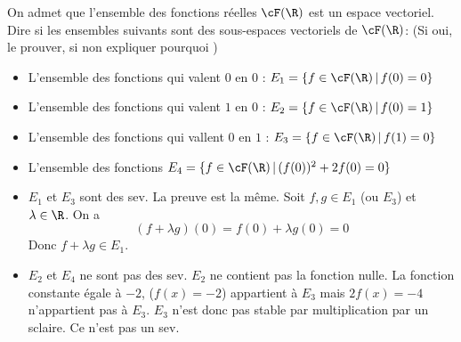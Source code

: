 



\begin{exercice}
On admet que l'ensemble des fonctions réelles $\cF(\R)$ est un espace vectoriel. 
Dire si les ensembles suivants sont des sous-espaces vectoriels de $\cF(\R)$: 
(Si oui, le prouver, si non expliquer pourquoi )
\begin{itemize}
\item L'ensemble des fonctions qui valent $0$ en $0$ : $E_1 = \{ f \in  \cF(\R)\, |\, f(0)=0 \}$ 
\item L'ensemble des fonctions qui valent $1$ en $0$ : $E_2 = \{ f \in  \cF(\R)\, |\, f(0)=1 \}$ 
\item L'ensemble des fonctions qui vallent $0$ en $1$ : $E_3 = \{ f \in  \cF(\R)\, |\, f(1)=0 \}$
\item L'ensemble des fonctions $E_4 = \{ f \in  \cF(\R)\, |\, (f(0))^2 +2f(0)=0 \}$
\end{itemize}


\end{exercice}
\begin{correction}
\begin{itemize}
\item $E_1$  et $E_3$ sont des  sev. La preuve est la même. Soit $f, g\in E_1 $ (ou $E_3$) et $\lambda\in \R$. On a 
$$(f+\lambda g) (0)  = f(0)+\lambda g(0) = 0$$
Donc $f+\lambda g \in E_1$. 
\item $E_2$ et $E_4$ ne sont pas des sev.  $E_2$ ne contient pas la fonction nulle. 
La fonction constante égale à $-2$, ($f(x) =-2$) appartient à  $E_3$  mais $2f(x) =-4$ n'appartient pas à $E_3$. $E_3$ n'est donc pas stable par multiplication par un sclaire. Ce n'est pas un sev.  

\end{itemize}
\end{correction}